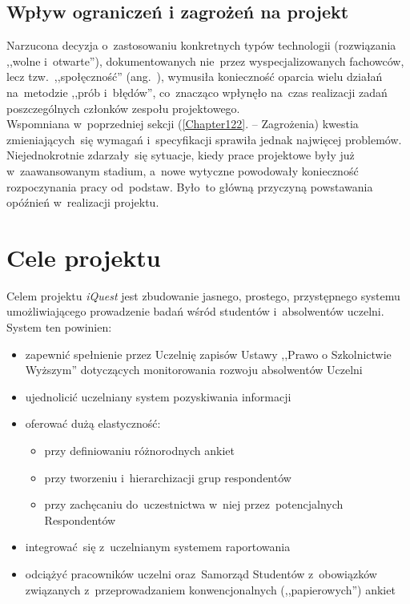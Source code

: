 \subsection{Wpływ ograniczeń i zagrożeń na projekt}
\label{Chapter123}

Narzucona decyzja o~zastosowaniu konkretnych typów technologii (rozwiązania ,,wolne i~otwarte''), dokumentowanych nie~przez wyspecjalizowanych fachowców, lecz tzw.~,,społęczność'' (ang.~), wymusiła konieczność oparcia wielu działań na~metodzie ,,prób i~błędów'', co~znacząco wpłynęło na~czas realizacji zadań poszczególnych członków zespołu projektowego. \\

Wspomniana w~poprzedniej sekcji (\ref{Chapter122}. -- Zagrożenia) kwestia zmieniających~się wymagań i~specyfikacji sprawiła jednak najwięcej problemów. Niejednokrotnie zdarzały~się sytuacje, kiedy prace projektowe były już w~zaawansowanym stadium, a~nowe wytyczne powodowały konieczność rozpoczynania pracy od~podstaw. Było~to główną przyczyną powstawania opóźnień w~realizacji projektu.

\section{Cele projektu}
\label{Chapter13}

Celem projektu \textit{iQuest} jest zbudowanie jasnego, prostego, przystępnego systemu umożliwiającego prowadzenie badań wśród studentów i~absolwentów uczelni. System ten powinien:
\begin{itemize}
\item{zapewnić spełnienie przez Uczelnię zapisów Ustawy ,,Prawo o Szkolnictwie Wyższym'' dotyczących monitorowania rozwoju absolwentów Uczelni\cite{AP:PoSW05}}
\item{ujednolicić uczelniany system pozyskiwania informacji}
\item{oferować dużą elastyczność:
\begin{itemize}
\item{przy definiowaniu różnorodnych ankiet}
\item{przy tworzeniu i~hierarchizacji grup respondentów}
\item{przy zachęcaniu do~uczestnictwa w~niej przez~potencjalnych Respondentów}
\end{itemize}}
\item{integrować~się z~uczelnianym systemem raportowania}
\item{odciążyć pracowników uczelni oraz~Samorząd Studentów z~obowiązków związanych z~przeprowadzaniem konwencjonalnych (,,papierowych'') ankiet}
\end{itemize}

